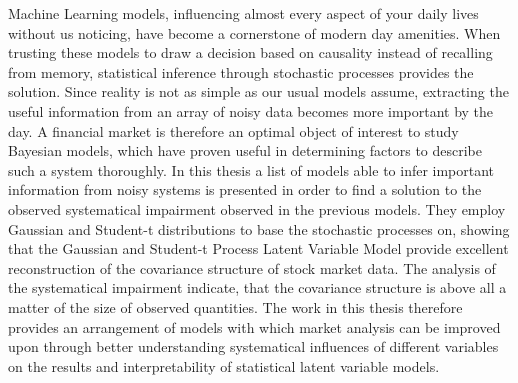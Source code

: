\label{sec:zusammenfassung}

Machine Learning models, influencing almost every aspect of your daily lives without us noticing, have become a cornerstone of modern day amenities. When trusting these models to draw a decision based on causality instead of recalling from memory, statistical inference through stochastic processes provides the solution. Since reality is not as simple as our usual models assume, extracting the useful information from an array of noisy data becomes more important by the day. A financial market is therefore an optimal object of interest to study Bayesian models, which have proven useful in determining factors to describe such a system thoroughly. In this thesis a list of models able to infer important information from noisy systems is presented in order to find a solution to the observed systematical impairment observed in the previous models. They employ Gaussian and Student-t distributions to base the stochastic processes on, showing that the Gaussian and Student-t Process Latent Variable Model provide excellent reconstruction of the covariance structure of stock market data. The analysis of the systematical impairment indicate, that the covariance structure is above all a matter of the size of observed quantities. The work in this thesis therefore provides an arrangement of models with which market analysis can be improved upon through better understanding systematical influences of different variables on the results and interpretability of statistical latent variable models.
